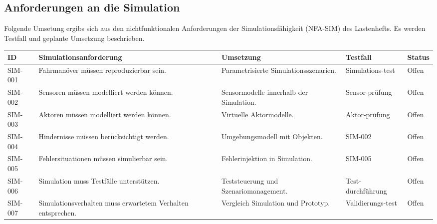 \subsection{Anforderungen an die
Simulation}\label{anforderungen-an-die-simulation}

Folgende Umsetung ergibs sich aus den nichtfunktionalen Anforderungen
der Simulationsfähigkeit (NFA-SIM) des Lastenhefts. Es werden Testfall
und geplante Umsetzung beschrieben.

\begin{longtable}[]{@{}
  >{\raggedright\arraybackslash}p{}
  >{\raggedright\arraybackslash}p{}
  >{\raggedright\arraybackslash}p{}
  >{\raggedright\arraybackslash}p{}
  >{\raggedleft\arraybackslash}p{}@{}}
\toprule\noalign{}
\begin{minipage}[b]{\linewidth}\raggedright
ID
\end{minipage} & \begin{minipage}[b]{\linewidth}\raggedright
Simulationsanforderung
\end{minipage} & \begin{minipage}[b]{\linewidth}\raggedright
Umsetzung
\end{minipage} & \begin{minipage}[b]{\linewidth}\raggedright
Testfall
\end{minipage} & \begin{minipage}[b]{\linewidth}\raggedleft
Status
\end{minipage} \\
\midrule\noalign{}
\endhead
\bottomrule\noalign{}
\endlastfoot
SIM-001 & Fahrmanöver müssen reproduzierbar sein. & Parametrisierte
Simulationsszenarien. & Simulations-test & Offen \\
SIM-002 & Sensoren müssen modelliert werden können. & Sensormodelle
innerhalb der Simulation. & Sensor-prüfung & Offen \\
SIM-003 & Aktoren müssen modelliert werden können. & Virtuelle
Aktormodelle. & Aktor-prüfung & Offen \\
SIM-004 & Hindernisse müssen berücksichtigt werden. & Umgebungsmodell
mit Objekten. & SIM-002 & Offen \\
SIM-005 & Fehlersituationen müssen simulierbar sein. & Fehlerinjektion
in Simulation. & SIM-005 & Offen \\
SIM-006 & Simulation muss Testfälle unterstützen. & Teststeuerung und
Szenariomanagement. & Test-durchführung & Offen \\
SIM-007 & Simulationsverhalten muss erwartetem Verhalten entsprechen. &
Vergleich Simulation und Prototyp. & Validierungs-test & Offen \\
\end{longtable}

